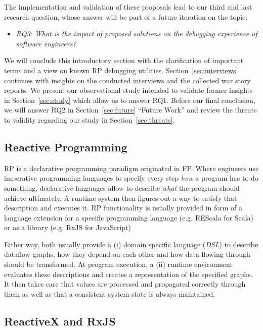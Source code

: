 \documentclass[sigplan,screen,review]{acmart}
\begin{document}
The implementation and validation of these proposals lead to our third and last research question, whose answer will be part of a future iteration on the topic:

\begin{itemize}
	\item \emph{RQ3: What is the impact of proposed solutions on the debugging experience of software engineers?}
\end{itemize}

We will conclude this introductory section with the clarification of important terms and a view on known RP debugging utilities. Section~\ref{sec:interviews} continues with insights on the conducted interviews and the collected war story reports. We present our observational study intended to validate former insights in Section~\ref{sec:study} which allow us to answer RQ1. Before our final conclusion, we will answer RQ2 in Section~\ref{sec:future} ``Future Work'' and review the threats to validity regarding our study in Section~\ref{sec:threats}.

\subsection{Reactive Programming}

RP is a declarative programming paradigm originated in FP. Where engineers use imperative programming languages to specify every step \emph{how} a program has to do something, declarative languages allow to describe \emph{what} the program should achieve ultimately. A runtime system then figures out a way to satisfy that description and executes it. RP functionality is usually provided in form of a language extension for a specific programming language (e.g. REScala for Scala\cite{10.1145/2577080.2577083}) or as a library (e.g. RxJS for JavaScript\cite{rxjs})

Either way, both usually provide a (i) domain specific language (\emph{DSL}) to describe dataflow graphs, how they depend on each other and how data flowing through should be transformed. At program execution, a (ii) runtime environment evaluates these descriptions and creates a representation of the specified graphs. It then takes care that values are processed and propagated correctly through them as well as that a consistent system state\cite{10.1145/2501654.2501666} is always maintained.

\subsection{ReactiveX and RxJS}
\end{document}
